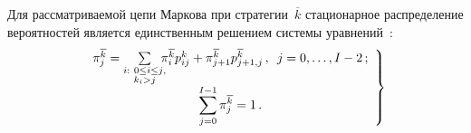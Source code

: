   
  
  Для рассматриваемой цепи Маркова при стратегии~$\overline{k}$
стационарное распределение вероятностей является единственным решением
системы уравнений~\cite{8-aga}: %
  \begin{equation}
  \left.
  \begin{array}{c}
  \pi_j^{\overline{k}} = \sum\limits_{\substack{{i:\ 0\leq i\leq j},\\ {k_i>j}}}
  \hspace*{-2mm}\pi_i^{\overline{k}}
p_{ij}^k +\pi_{j+1}^{\overline{k}}  p_{j+1,j}^{\overline{k}}\,,\enskip j=0,\ldots, I-
2\,;\\[6pt]
     \displaystyle \sum\limits_{j=0}^{I-1} \pi_j^{\overline{k}} = 1\,.
      \end{array}
      \right\}
      \label{e20-aga}
\end{equation}


